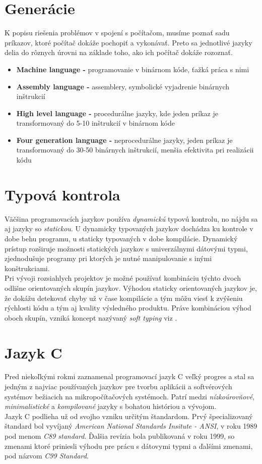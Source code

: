 \documentclass[11pt,a4paper,titlepage]{article}
\begin{document}
\section{Generácie}
K popisu riešenia problémov v spojení s počítačom, musíme poznať sadu príkazov, ktoré počítač dokáže pochopiť a vykonávať. Preto sa jednotlivé jazyky delia do rôznych úrovni na základe toho, ako ich počítač dokáže rozoznať. \cite{Generation:Book}
\begin{itemize}
\item \textbf{Machine language -} programovanie v binárnom kóde, ťažká práca s nimi
\item \textbf{Assembly language -} assemblery, symbolické vyjadrenie binárnych inštrukcií
\item \textbf{High level language -} procedurálne jazyky, kde jeden príkaz je transformovaný do 5-10 inštrukcií v binárnom kóde
\item \textbf{Four generation language -} neprocedurálne jazyky, jeden príkaz je transformovaný do 30-50 binárnych inštrukcií, menšia efektivita pri realizácii kódu
\end{itemize}

\section{Typová kontrola}
Väčšina programovacích jazykov používa \textit{dynamickú} typovú kontrolu, no nájdu sa aj jazyky so \textit{statickou}. U dynamicky typovaných jazykov dochádza ku kontrole v dobe behu programu, u staticky typovaných v dobe kompilácie. Dynamický prístup rozširuje možnosti statických jazykov s univerzálnymi dátovými typmi, zjednodušuje programy pri ktorých je nutné manipulovanie s inými konštrukciami. \cite{Dynamic:Book} \\ 
Pri vývoji rozsiahlych projektov je možné používať kombináciu týchto dvoch odlišne orientovaných skupín jazykov. Výhodou staticky orientovaných jazykov je, že dokážu detekovať chyby už v čase kompilácie a tým môžu viesť k zvýšeniu rýchlosti kódu a tým aj kvality výsledného produktu. Práve kombináciou výhod oboch skupín, vzniká koncept nazývaný \textit{soft typing} viz \cite{Master:tesis}. 

\newpage

\section{Jazyk C}
Pred niekoľkými rokmi zaznamenal programovací jazyk C veľký progres a stal sa jedným z najviac používaných jazykov pre tvorbu aplikácii a softvérových systémov bežiacich na mikropočítačových systémoch. Patrí medzi \textit{nízkoúrovňové}, \textit{minimalistické} a \textit{kompilované} jazyky s bohatou históriou a vývojom. \cite{C:Journal} \\
Jazyk C podlieha už od svojho vzniku určitým štandardom. Prvý špecializovaný štandard bol vyvíjaný \textit{American National Standards Insitute - ANSI}, v roku 1989 pod menom \textit{C89 standard}. Ďalšia revízia bola publikovaná v roku 1999, so zmenami ktoré priniesli výhodu pre prácu s dátovymi typmi a ďalšími zmenami, pod názvom \textit{C99 Standard}. \cite{ANSI:web}
\end{document}
